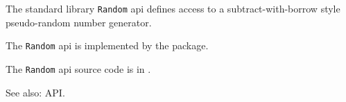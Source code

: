 
The standard library {\tt Random} api defines access to a subtract-with-borrow style pseudo-random 
number generator.

The {\tt Random} api is implemented by the  package.

The {\tt Random} api source code is in .

See also:   API.

